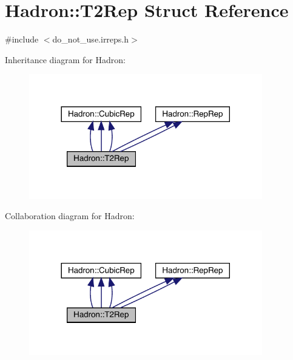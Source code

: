 \hypertarget{structHadron_1_1T2Rep}{}\section{Hadron\+:\+:T2\+Rep Struct Reference}
\label{structHadron_1_1T2Rep}


{\ttfamily \#include $<$do\+\_\+not\+\_\+use.\+irreps.\+h$>$}



Inheritance diagram for Hadron\+:
\nopagebreak
\begin{figure}[H]
\begin{center}
\leavevmode
\includegraphics[width=288pt]{d5/df9/structHadron_1_1T2Rep__inherit__graph}
\end{center}
\end{figure}


Collaboration diagram for Hadron\+:
\nopagebreak
\begin{figure}[H]
\begin{center}
\leavevmode
\includegraphics[width=288pt]{de/de8/structHadron_1_1T2Rep__coll__graph}
\end{center}
\end{figure}

